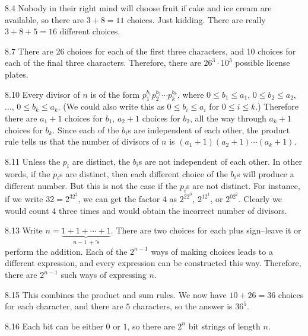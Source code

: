 \begin{Answer}{8.4}
Nobody in their right mind will choose fruit if cake and ice cream are
available, so there are $3+8=11$ choices.
Just kidding.  There are really $3+8+5=16$ different choices.
\end{Answer}
\begin{Answer}{8.7}
There are 26 choices for each of the first three characters,
and 10 choices for each of the final three characters.
Therefore, there are $26^3\cdot10^3$ possible license plates.
\end{Answer}
\begin{Answer}{8.10}
Every divisor of $n$ is of the form $p_1^{b_1}p_2^{b_2}\cdots p_k^{b_k}$,
where $0\leq b_1\leq a_1$, $0\leq b_2\leq a_2$, $\ldots$, $0\leq b_k\leq a_k$.
(We could also write this as $0\leq b_i\leq a_i$ for $0\leq i\leq k$.)
Therefore there are $a_1+1$ choices for $b_1$,
$a_2+1$ choices for $b_2$, all the way through
$a_k+1$ choices for $b_k$.
Since each of the $b_i$s are independent of each other,
the product rule tells us that the number of divisors of $n$ is
$(a_1 + 1)(a_2 + 1)\cdots (a_k + 1)$.
\end{Answer}
\begin{Answer}{8.11}
Unless the $p_i$ are distinct, the $b_i$s are not independent of each other.
In other words, if the $p_i$s are distinct, then each different choice of the $b_i$s
will produce a different number.  But this is not the case if the $p_i$s are not
distinct.  For instance, if we write $32=2^32^2$, we can get the factor $4$ as
$2^22^0$, $2^12^1$, or $2^02^2$.  Clearly we would count $4$ three times and
would obtain the incorrect number of divisors.
\end{Answer}
\begin{Answer}{8.13}
Write $n = \underbrace{1 + 1 + \cdots + 1}_{n-1 \ +\mathrm{'s}}$.
There are two choices for each plus sign--leave it or perform the addition.
Each of the $2^{n-1}$ ways of making choices leads to a different
expression, and every expression can be constructed this way.
Therefore, there are $2^{n-1}$ such ways of expressing $n$.
\end{Answer}
\begin{Answer}{8.15}
This combines the product and sum rules.
We now have $10+26=36$ choices for each character, and there are $5$ characters,
so the answer is $36^5$.
\end{Answer}
\begin{Answer}{8.16}
Each bit can be either $0$ or $1$, so there are $2^n$ bit strings of length $n$.
\end{Answer}
